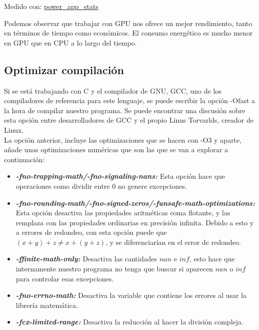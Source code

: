 \begin{ejemplo}
\begin{table}[h]
    \caption{Medido con:  \href{https://github.com/JoseCarlosGarcia95/power_app_stats}{power\_app\_stats}}
  \end{table}

  Podemos observar que trabajar con GPU nos ofrece un mejor rendimiento, tanto en términos de tiempo como económicos. El consumo energético es mucho menor en GPU que en CPU a lo largo del tiempo.
\end{ejemplo}

\subsection{Optimizar compilación}
Si se está trabajando con C y el compilador de GNU, GCC, uno de los compiladores de referencia para este lenguaje, se puede escribir la opción -Ofast a la hora de compilar nuestro programa. Se puede encontrar una discusión sobre esta opción entre desarrolladores de GCC y el propio Linus Torvarlds, creador de Linux. \cite{linusfast} \\
La opción anterior, incluye las optimizaciones que se hacen con -O3 y aparte, añade unas optimizaciones numéricas que son las que se van a explorar a continuación:

\begin{itemize}
	\item \textbf{\textit{-fno-trapping-math/-fno-signaling-nans: }} Esta opción hace que operaciones como dividir entre $0$ no genere excepciones.
	
	\item \textbf{\textit{-fno-rounding-math/-fno-signed-zeros/-funsafe-math-optimizations: }} Esta opción desactiva las propiedades aritméticas coma flotante, y las remplaza con las propiedades ordinarias en precisión infinita. Debido a esto y a errores de redondeo, con esta opción puede que $(x+y)+z \neq x + (y+z)$, y se diferenciarían en el error de redondeo.
	
	\item \textbf{\textit{-ffinite-math-only: }} Desactiva las cantidades $nan$ e $inf$, esto hace que internamente nuestro programa no tenga que buscar si aparecen $nan$ o $inf$ para controlar esas excepciones.
	
	\item \textbf{\textit{-fno-errno-math: }} Desactiva la variable que contiene los errores al usar la librería matemática.
	
	\item \textbf{\textit{-fcx-limited-range: }} Desactiva la reducción al hacer la división compleja.
\end{itemize}

